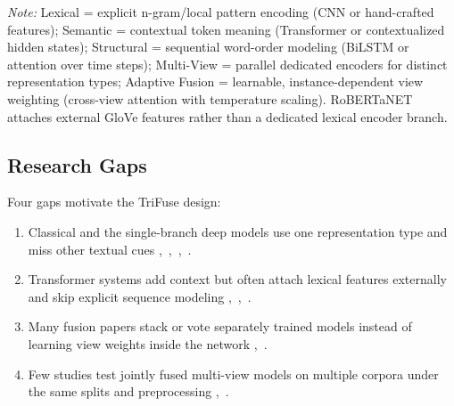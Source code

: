 \begin{table}[!t]
\caption{Comparison of the Representation Coverage Across Model Families}
\label{tab:rep_comparison}
\centering
{}
\vspace{2pt}
{\footnotesize \textit{Note:} Lexical = explicit n-gram/local pattern encoding (CNN or hand-crafted features); Semantic = contextual token meaning (Transformer or contextualized hidden states); Structural = sequential word-order modeling (BiLSTM or attention over time steps); Multi-View = parallel dedicated encoders for distinct representation types; Adaptive Fusion = learnable, instance-dependent view weighting (cross-view attention with temperature scaling). RoBERTaNET attaches external GloVe features rather than a dedicated lexical encoder branch.}
\end{table}

\subsection{Research Gaps}

Four gaps motivate the TriFuse design:
\begin{enumerate}
\item Classical and  the single-branch deep models use one representation type and miss other textual cues \cite{ref5},~\cite{ref6},~\cite{ref7},~\cite{ref8}.
\item Transformer systems add context but often attach lexical features externally and skip explicit sequence modeling \cite{ref9},~\cite{ref15},~\cite{ref16}.
\item Many fusion papers stack or vote separately trained models instead of learning view weights inside the network \cite{ref14},~\cite{ref19}.
\item Few studies test jointly fused multi-view models on multiple corpora under the same splits and preprocessing \cite{ref12},~\cite{ref13}.
\end{enumerate}

